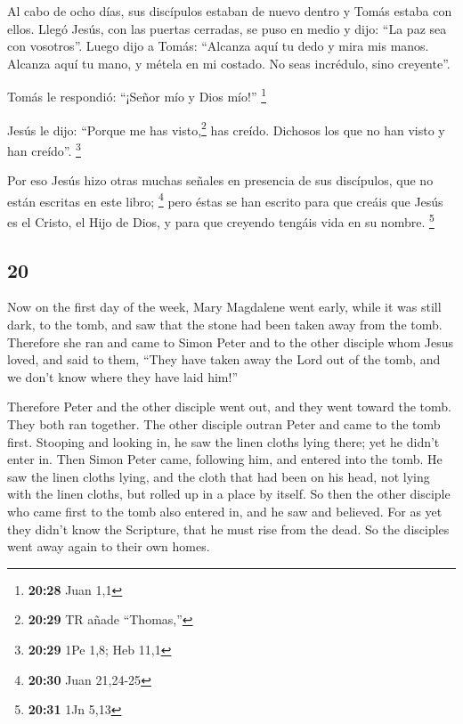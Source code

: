 \begin{paracol}{2}
 Al cabo de ocho días, sus discípulos estaban de nuevo
dentro y Tomás estaba con ellos. Llegó Jesús, con las puertas cerradas,
se puso en medio y dijo: ``La paz sea con vosotros''. 
Luego dijo a Tomás: ``Alcanza aquí tu dedo y mira mis manos. Alcanza
aquí tu mano, y métela en mi costado. No seas incrédulo, sino
creyente''.

 Tomás le respondió: ``¡Señor mío y Dios mío!''
\footnote{\textbf{20:28} Juan 1,1}

 Jesús le dijo: ``Porque me has visto,\footnote{\textbf{20:29}
  TR añade ``Thomas,''} has creído. Dichosos los que no han visto y han
creído''. \footnote{\textbf{20:29} 1Pe 1,8; Heb 11,1}

 Por eso Jesús hizo otras muchas señales en presencia de
sus discípulos, que no están escritas en este libro; \footnote{\textbf{20:30}
  Juan 21,24-25}  pero éstas se han escrito para que
creáis que Jesús es el Cristo, el Hijo de Dios, y para que creyendo
tengáis vida en su nombre. \footnote{\textbf{20:31} 1Jn 5,13}

\switchcolumn
\begin{otherlanguage}{english}

\hypertarget{section-39}{%
\section{20}\label{section-39}}

 Now on the first day of the week, Mary Magdalene went
early, while it was still dark, to the tomb, and saw that the stone had
been taken away from the tomb.  Therefore she ran and came
to Simon Peter and to the other disciple whom Jesus loved, and said to
them, ``They have taken away the Lord out of the tomb, and we don't know
where they have laid him!''

 Therefore Peter and the other disciple went out, and they
went toward the tomb.  They both ran together. The other
disciple outran Peter and came to the tomb first. 
Stooping and looking in, he saw the linen cloths lying there; yet he
didn't enter in.  Then Simon Peter came, following him,
and entered into the tomb. He saw the linen cloths lying, 
and the cloth that had been on his head, not lying with the linen
cloths, but rolled up in a place by itself.  So then the
other disciple who came first to the tomb also entered in, and he saw
and believed.  For as yet they didn't know the Scripture,
that he must rise from the dead.  So the disciples went
away again to their own homes.


\end{otherlanguage}
\end{paracol}
